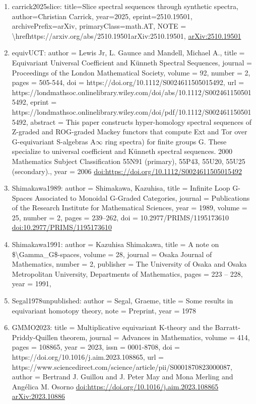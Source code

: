 \documentclass[11pt]{article}
\begin{document}
\begin{enumerate}[leftmargin=*]
  \item carrick2025slice: title=Slice spectral sequences through synthetic spectra, author=Christian Carrick, year=2025, eprint=2510.19501, archivePrefix=arXiv, primaryClass=math.AT, NOTE = \textbackslash{}hrefhttps://arxiv.org/abs/2510.19501arXiv:2510.19501, \href{https://arxiv.org/abs/2510.19501}{arXiv:2510.19501}
  \item equivUCT: author = Lewis Jr, L. Gaunce and Mandell, Michael A., title = Equivariant Universal Coefficient and Künneth Spectral Sequences, journal = Proceedings of the London Mathematical Society, volume = 92, number = 2, pages = 505-544, doi = https://doi.org/10.1112/S0024611505015492, url = https://londmathsoc.onlinelibrary.wiley.com/doi/abs/10.1112/S0024611505015492, eprint = https://londmathsoc.onlinelibrary.wiley.com/doi/pdf/10.1112/S0024611505015492, abstract = This paper constructs hyper-homology spectral sequences of Z-graded and ROG-graded Mackey functors that compute Ext and Tor over G-equivariant S-algebras A\ensuremath{\infty} ring spectra) for finite groups G. These specialize to universal coefficient and Künneth spectral sequences. 2000 Mathematics Subject Classification 55N91 (primary), 55P43, 55U20, 55U25 (secondary)., year = 2006 \href{https://doi.org/https://doi.org/10.1112/S0024611505015492}{doi:https://doi.org/10.1112/S0024611505015492}
  \item Shimakawa1989: author = Shimakawa, Kazuhisa, title = Infinite Loop G-Spaces Associated to Monoidal G-Graded Categories, journal = Publications of the Research Institute for Mathematical Sciences, year = 1989, volume = 25, number = 2, pages = 239--262, doi = 10.2977/PRIMS/1195173610 \href{https://doi.org/10.2977/PRIMS/1195173610}{doi:10.2977/PRIMS/1195173610}
  \item Shimakawa1991: author = Kazuhisa Shimakawa, title = A note on \$\textbackslash{}Gamma\_G\$-spaces, volume = 28, journal = Osaka Journal of Mathematics, number = 2, publisher = The University of Osaka and Osaka Metropolitan University, Departments of Mathematics, pages = 223 -- 228, year = 1991,
  \item Segal1978unpublished: author = Segal, Graeme, title = Some results in equivariant homotopy theory, note = Preprint, year = 1978
  \item GMMO2023: title = Multiplicative equivariant K-theory and the Barratt-Priddy-Quillen theorem, journal = Advances in Mathematics, volume = 414, pages = 108865, year = 2023, issn = 0001-8708, doi = https://doi.org/10.1016/j.aim.2023.108865, url = https://www.sciencedirect.com/science/article/pii/S0001870823000087, author = Bertrand J. Guillou and J. Peter May and Mona Merling and Angélica M. Osorno \href{https://doi.org/https://doi.org/10.1016/j.aim.2023.108865}{doi:https://doi.org/10.1016/j.aim.2023.108865} \href{https://arxiv.org/abs/2023.10886}{arXiv:2023.10886}

\end{enumerate}
\end{document}
